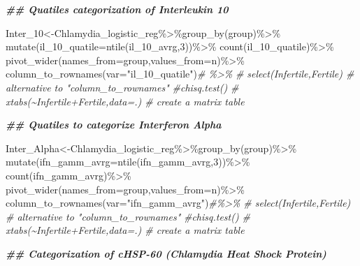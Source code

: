 \documentclass[
]{article}
\newenvironment{Shaded}{\begin{snugshade}}{\end{snugshade}}
\newcommand{\AttributeTok}[1]{\textcolor[rgb]{0.77,0.63,0.00}{#1}}
\newcommand{\CommentTok}[1]{\textcolor[rgb]{0.56,0.35,0.01}{\textit{#1}}}
\newcommand{\DecValTok}[1]{\textcolor[rgb]{0.00,0.00,0.81}{#1}}
\newcommand{\DocumentationTok}[1]{\textcolor[rgb]{0.56,0.35,0.01}{\textbf{\textit{#1}}}}
\newcommand{\FunctionTok}[1]{\textcolor[rgb]{0.00,0.00,0.00}{#1}}
\newcommand{\NormalTok}[1]{#1}
\newcommand{\OtherTok}[1]{\textcolor[rgb]{0.56,0.35,0.01}{#1}}
\newcommand{\SpecialCharTok}[1]{\textcolor[rgb]{0.00,0.00,0.00}{#1}}
\newcommand{\StringTok}[1]{\textcolor[rgb]{0.31,0.60,0.02}{#1}}
\begin{document}
\begin{Shaded}
\begin{Highlighting}[]
\DocumentationTok{\#\# Quatiles categorization of Interleukin 10}

\NormalTok{Inter\_10}\OtherTok{\textless{}{-}}\NormalTok{Chlamydia\_logistic\_reg}\SpecialCharTok{\%\textgreater{}\%}\FunctionTok{group\_by}\NormalTok{(group)}\SpecialCharTok{\%\textgreater{}\%}
  \FunctionTok{mutate}\NormalTok{(}\AttributeTok{il\_10\_quatile=}\FunctionTok{ntile}\NormalTok{(il\_10\_avrg,}\DecValTok{3}\NormalTok{))}\SpecialCharTok{\%\textgreater{}\%}
  \FunctionTok{count}\NormalTok{(il\_10\_quatile)}\SpecialCharTok{\%\textgreater{}\%}
  \FunctionTok{pivot\_wider}\NormalTok{(}\AttributeTok{names\_from=}\NormalTok{group,}\AttributeTok{values\_from=}\NormalTok{n)}\SpecialCharTok{\%\textgreater{}\%}
  \FunctionTok{column\_to\_rownames}\NormalTok{(}\AttributeTok{var=}\StringTok{"il\_10\_quatile"}\NormalTok{)}\CommentTok{\# \%\textgreater{}\%}
  \CommentTok{\# select(Infertile,Fertile) \# alternative to "column\_to\_rownames"}
  \CommentTok{\#chisq.test()}
 \CommentTok{\# xtabs(\textasciitilde{}Infertile+Fertile,data=.) \# create a matrix table}

\DocumentationTok{\#\# Quatiles to categorize Interferon Alpha}

\NormalTok{Inter\_Alpha}\OtherTok{\textless{}{-}}\NormalTok{Chlamydia\_logistic\_reg}\SpecialCharTok{\%\textgreater{}\%}\FunctionTok{group\_by}\NormalTok{(group)}\SpecialCharTok{\%\textgreater{}\%}
  \FunctionTok{mutate}\NormalTok{(}\AttributeTok{ifn\_gamm\_avrg=}\FunctionTok{ntile}\NormalTok{(ifn\_gamm\_avrg,}\DecValTok{3}\NormalTok{))}\SpecialCharTok{\%\textgreater{}\%}
  \FunctionTok{count}\NormalTok{(ifn\_gamm\_avrg)}\SpecialCharTok{\%\textgreater{}\%}
  \FunctionTok{pivot\_wider}\NormalTok{(}\AttributeTok{names\_from=}\NormalTok{group,}\AttributeTok{values\_from=}\NormalTok{n)}\SpecialCharTok{\%\textgreater{}\%}
  \FunctionTok{column\_to\_rownames}\NormalTok{(}\AttributeTok{var=}\StringTok{"ifn\_gamm\_avrg"}\NormalTok{)}\CommentTok{\#\%\textgreater{}\%}
  \CommentTok{\# select(Infertile,Fertile) \# alternative to "column\_to\_rownames"}
  \CommentTok{\#chisq.test()}
\CommentTok{\# xtabs(\textasciitilde{}Infertile+Fertile,data=.) \# create a matrix table}
 
\DocumentationTok{\#\# Categorization of cHSP{-}60 (Chlamydia Heat Shock Protein)}
  

\end{Highlighting}
\end{Shaded}
\end{document}
